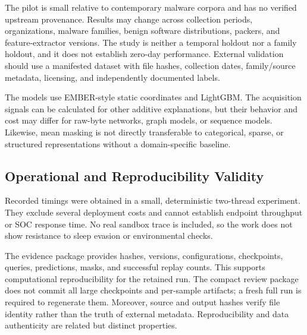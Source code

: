 The pilot is small relative to contemporary malware corpora and has no verified
upstream provenance. Results may change across collection periods, organizations,
malware families, benign software distributions, packers, and feature-extractor
versions. The study is neither a temporal holdout nor a family holdout, and it
does not establish zero-day performance. External validation should use a
manifested dataset with file hashes, collection dates, family/source metadata,
licensing, and independently documented labels.

The models use EMBER-style static coordinates and LightGBM. The acquisition
signals can be calculated for other additive explanations, but their behavior and
cost may differ for raw-byte networks, graph models, or sequence models. Likewise,
mean masking is not directly transferable to categorical, sparse, or structured
representations without a domain-specific baseline.

\subsection{Operational and Reproducibility Validity}

Recorded timings were obtained in a small, deterministic two-thread experiment.
They exclude several deployment costs and cannot establish endpoint throughput or
SOC response time. No real sandbox trace is included, so the work does not show
resistance to sleep evasion or environmental checks.

The evidence package provides hashes, versions, configurations, checkpoints,
queries, predictions, masks, and successful replay counts. This supports
computational reproducibility for the retained run. The compact review package
does not commit all large checkpoints and per-sample artifacts; a fresh full run
is required to regenerate them. Moreover, source and output hashes verify file
identity rather than the truth of external metadata. Reproducibility and data
authenticity are related but distinct properties.
